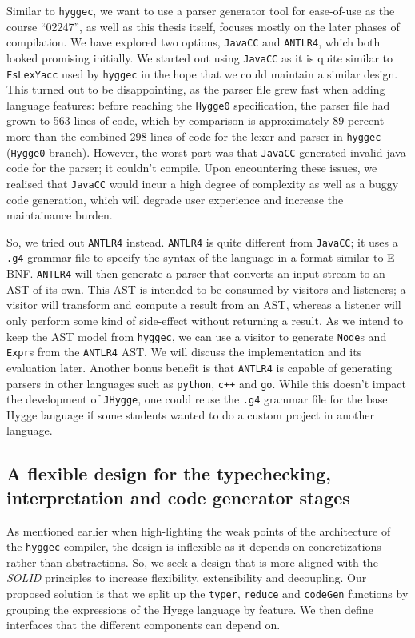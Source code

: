 Similar to \texttt{hyggec}, we want to use a parser generator tool for ease-of-use as the course ``02247'', as well as this
thesis itself, focuses mostly on the later phases of compilation. We have explored two options, \texttt{JavaCC} and \texttt{ANTLR4},
which both looked promising initially. We started out using \texttt{JavaCC} as it is quite similar to \texttt{FsLexYacc} used by
\texttt{hyggec} in the hope that we could maintain a similar design. This turned out to be disappointing, as the parser file
grew fast when adding language features: before reaching the \texttt{Hygge0} specification, the parser file had grown to 563
lines of code, which by comparison is approximately 89 percent more than the combined 298 lines of code for the lexer and
parser in \texttt{hyggec} (\texttt{Hygge0} branch). However, the worst part was that \texttt{JavaCC} generated invalid java
code for the parser; it couldn't compile. Upon encountering these issues, we realised that \texttt{JavaCC} would incur a
high degree of complexity as well as a buggy code generation, which will degrade user experience and increase the maintainance
burden.

So, we tried out \texttt{ANTLR4} instead. \texttt{ANTLR4} is quite different from \texttt{JavaCC}; it uses a \texttt{.g4} grammar
file to specify the syntax of the language in a format similar to E-BNF. \texttt{ANTLR4} will then generate a parser that converts
an input stream to an AST of its own. This AST is intended to be consumed by visitors and listeners; a visitor will transform and
compute a result from an AST, whereas a listener will only perform some kind of side-effect without returning a result. As we
intend to keep the AST model from \texttt{hyggec}, we can use a visitor to generate \texttt{Node}s and \texttt{Expr}s from the
\texttt{ANTLR4} AST. We will discuss the implementation and its evaluation later. Another bonus benefit is that \texttt{ANTLR4}
is capable of generating parsers in other languages such as \texttt{python}, \texttt{c++} and \texttt{go}. While this doesn't
impact the development of \texttt{JHygge}, one could reuse the \texttt{.g4} grammar file for the base Hygge language if some
students wanted to do a custom project in another language.

\subsection{A flexible design for the typechecking, interpretation and code generator stages}

As mentioned earlier when high-lighting the weak points of the architecture of the \texttt{hyggec} compiler, the design is inflexible as it
depends on concretizations rather than abstractions. So, we seek a design that is more aligned with the \textit{SOLID} principles
to increase flexibility, extensibility and decoupling. Our proposed solution is that we split up the \texttt{typer}, \texttt{reduce}
and \texttt{codeGen} functions by grouping the expressions of the Hygge language by feature. We then define interfaces that the
different components can depend on.

